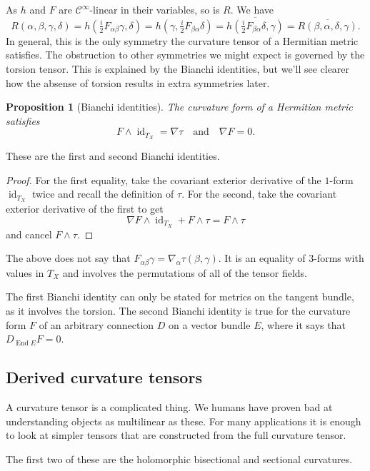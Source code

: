 \documentclass[11pt]{article}
\newtheorem{prop}[theo]{Proposition}
\theoremstyle{definition}
\newcommand{\cc}[1]{\mathcal{#1}}
\DeclareMathOperator{\End}{End}
\DeclareMathOperator{\id}{id}
\begin{document}
As $h$ and $F$ are $\cc C^\infty$-linear in their variables, so is $R$. We have
$$
R(\alpha,\beta,\gamma,\delta)
= h(\tfrac i2 F_{\alpha\beta}\gamma, \delta)
= h(\gamma, \tfrac i2 F_{\beta\alpha}\delta)
= \overline{h(\tfrac i2 F_{\beta\alpha}\delta, \gamma)}
= \overline{R(\beta,\alpha,\delta,\gamma)}.
$$
In general, this is the only symmetry the curvature tensor of a Hermitian metric satisfies. The obstruction to other symmetries we might expect is governed by the torsion tensor. This is explained by the Bianchi identities, but we'll see clearer how the absense of torsion results in extra symmetries later.


\begin{prop}[Bianchi identities]
The curvature form of a Hermitian metric satisfies
$$
F \wedge \id_{T_X} = \nabla \tau
\quad\text{and}\quad
\nabla F = 0.
$$
\end{prop}

These are the first and second Bianchi identities.

\begin{proof}
  For the first equality, take the covariant exterior derivative of the $1$-form $\id_{T_X}$ twice and recall the definition of $\tau$. For the second, take the covariant exterior derivative of the first to get
$$
\nabla F \wedge \id_{T_X} + F \wedge \tau = F \wedge \tau
$$
and cancel $F \wedge \tau$.
\end{proof}


The above does not say that $F_{\alpha\beta}\gamma = \nabla_\alpha \tau(\beta,\gamma)$. It is an equality of $3$-forms with values in $T_X$ and involves the permutations of all of the tensor fields.

The first Bianchi identity can only be stated for metrics on the tangent bundle, as it involves the torsion. The second Bianchi identity is true for the curvature form $F$ of an arbitrary connection $D$ on a vector bundle $E$, where it says that $D_{\End E} F = 0$.


\subsection{Derived curvature tensors}


A curvature tensor is a complicated thing. We humans have proven bad at understanding objects as multilinear as these. For many applications it is enough to look at simpler tensors that are constructed from the full curvature tensor.

The first two of these are the holomorphic bisectional and sectional curvatures.
\end{document}
